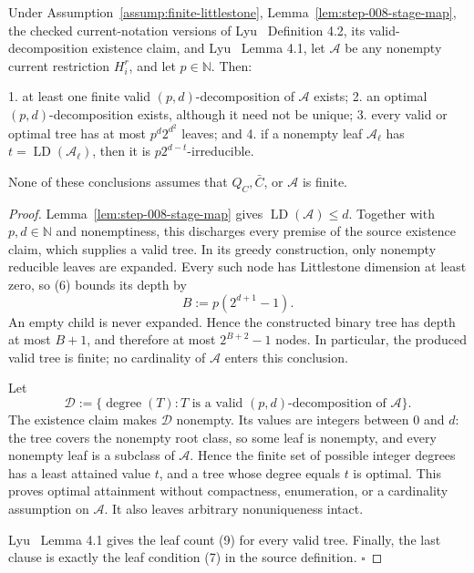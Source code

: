 \begin{proposition}\label{prop:step-008-decompositions}
Under Assumption~\ref{assump:finite-littlestone},
Lemma~\ref{lem:step-008-stage-map}, the checked current-notation versions
of Lyu~\citep{lyu2025} Definition 4.2, its valid-decomposition existence claim, and
Lyu~\citep{lyu2025} Lemma 4.1, let \(\mathcal A\) be any nonempty current restriction
\(H_i^r\), and let \(p\in\mathbb N\). Then:

1. at least one finite valid \((p,d)\)-decomposition of \(\mathcal A\)
   exists;
2. an optimal \((p,d)\)-decomposition exists, although it need not be
   unique;
3. every valid or optimal tree has at most \(p^d2^{d^2}\) leaves; and
4. if a nonempty leaf \(\mathcal A_\ell\) has
   \(t=\operatorname{LD}(\mathcal A_\ell)\), then it is
   \(p2^{d-t}\)-irreducible.

None of these conclusions assumes that \(Q_C,\bar C\), or
\(\mathcal A\) is finite.


\end{proposition}

\begin{proof}
Lemma~\ref{lem:step-008-stage-map} gives
\(\operatorname{LD}(\mathcal A)\le d\). Together with \(p,d\in\mathbb N\)
and nonemptiness, this discharges every premise of the source existence
claim, which supplies a valid tree. In its greedy construction, only
nonempty reducible leaves are expanded. Every such node has Littlestone
dimension at least zero, so (6) bounds its depth by
\[
 B:=p(2^{d+1}-1).
\]
An empty child is never expanded. Hence the constructed binary tree has
depth at most \(B+1\), and therefore at most
\(2^{B+2}-1\) nodes. In particular, the produced valid tree is finite; no
cardinality of \(\mathcal A\) enters this conclusion.

Let
\[
 \mathscr D
 :=\{\operatorname{degree}(T):T\text{ is a valid }(p,d)
                         \text{-decomposition of }\mathcal A\}.
\]
The existence claim makes \(\mathscr D\) nonempty. Its values are integers
between \(0\) and \(d\): the tree covers the nonempty root class, so some
leaf is nonempty, and every nonempty leaf is a subclass of
\(\mathcal A\). Hence the finite set of possible integer degrees has a
least attained value \(t\), and a tree whose degree equals \(t\) is
optimal. This proves optimal attainment without compactness, enumeration,
or a cardinality assumption on \(\mathcal A\). It also leaves arbitrary
nonuniqueness intact.

Lyu~\citep{lyu2025} Lemma 4.1 gives the leaf count (9) for every valid tree. Finally, the
last clause is exactly the leaf condition (7) in the source definition.
\(\square\)


\end{proof}

